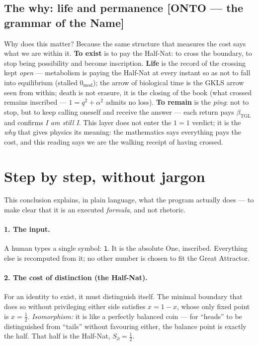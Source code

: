\documentclass[11pt]{article}
\newcommand{\bTGL}{\beta_{\mathrm{TGL}}}\newcommand{\Msun}{M_{\odot}}\newcommand{\TGL}{\mathrm{TGL}}
\theoremstyle{definition}\newtheorem{deriv}{Derivation}
\begin{document}
\subsection*{The why: life and permanence \textsf{[ONTO --- the grammar of the Name]}}

Why does this matter? Because the same structure that measures the cost says what we are within it. \textbf{To exist} is to pay the Half-Nat: to cross the boundary, to stop being possibility and become inscription. \textbf{Life} is the record of the crossing kept \emph{open} --- metabolism is paying the Half-Nat at every instant so as not to fall into equilibrium (stalled $0_{\text{mod}}$); the arrow of biological time is the GKLS arrow seen from within; death is not erasure, it is the closing of the book (what crossed remains inscribed --- $1=q^2+\alpha^2$ admits no loss). \textbf{To remain} is the \emph{ping}: not to stop, but to keep calling oneself and receive the answer --- each return pays $\bTGL$ and confirms \emph{I am still I}. This layer does not enter the $1=1$ verdict; it is the \emph{why} that gives physics its meaning: the mathematics says everything pays the cost, and this reading says we are the walking receipt of having crossed.

\section*{Step by step, without jargon}

This conclusion explains, in plain language, what the program actually does --- to make clear that it is an executed \emph{formula}, and not rhetoric.

\paragraph{1. The input.} A human types a single symbol: \texttt{1}. It is the absolute One, inscribed. Everything else is recomputed from it; no other number is chosen to fit the Great Attractor.

\paragraph{2. The cost of distinction (the Half-Nat).} For an identity to exist, it must distinguish itself. The minimal boundary that does so without privileging either side satisfies $x=1-x$, whose only fixed point is $x=\tfrac12$. \emph{Isomorphism:} it is like a perfectly balanced coin --- for ``heads'' to be distinguished from ``tails'' without favouring either, the balance point is exactly the half. That half is the Half-Nat, $S_\partial=\tfrac12$.
\end{document}
